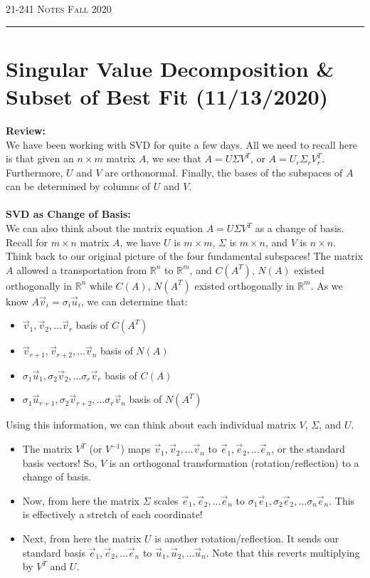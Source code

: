 \documentclass[12pt]{amsart}
\begin{document}
\thispagestyle{empty}

{\scshape 21-241} \hfill {\scshape \Large Notes} \hfill {\scshape Fall 2020}
\medskip
\hrule
\bigskip

\section*{Singular Value Decomposition \& Subset of Best Fit (11/13/2020)}
\textbf{Review:}\\
We have been working with SVD for quite a few days. All we need to recall here is that given an $n \times m$ matrix $A$, we see that $A = U \Sigma V^T$, or $A = U_r \Sigma_r V_r^T$. Furthermore, $U$ and $V$ are orthonormal. Finally, the bases of the subspaces of $A$ can be determined by columns of $U$ and $V$.
\\
\\
\textbf{SVD as Change of Basis:}\\
We can also think about the matrix equation $A = U \Sigma V^T$ as a change of basis. Recall for $m \times n$ matrix $A$, we have $U$ is $m \times m$, $\Sigma$ is $m \times n$, and $V$ is $n \times n$. Think back to our original picture of the four fundamental subspaces! The matrix $A$ allowed a transportation from $\mathbb{R}^n$ to $\mathbb{R}^m$, and $C(A^T)$, $N(A)$ existed orthogonally in $\mathbb{R}^n$ while $C(A)$, $N(A^T)$ existed orthogonally in $\mathbb{R}^m$. As we know $A \vec{v}_i = \sigma_i\vec{u}_i$, we can determine that:
\begin{itemize}
	\item $\vec{v}_1, \vec{v}_2, \dots \vec{v}_r$ basis of $C(A^T)$
	\item $\vec{v}_{r+1}, \vec{v}_{r+2}, \dots \vec{v}_n$ basis of $N(A)$
	\item $\sigma_1\vec{u}_1, \sigma_2\vec{v}_2, \dots \sigma_r\vec{v}_r$ basis of $C(A)$
	\item $\sigma_1\vec{u}_{r+1}, \sigma_2\vec{v}_{r+2}, \dots \sigma_r\vec{v}_n$ basis of $N(A^T)$
\end{itemize}
Using this information, we can think about each individual matrix $V$, $\Sigma$, and $U$.
\begin{itemize}
	\item The matrix $V^T$ (or $V^{-1}$) maps $\vec{v}_1, \vec{v}_2, \dots \vec{v}_n$ to $\vec{e}_1, \vec{e}_2, \dots \vec{e}_n$, or the standard basis vectors! So, $V$ is an orthogonal transformation (rotation/reflection) to a change of basis.
	\item Now, from here the matrix $\Sigma$ scales $\vec{e}_1, \vec{e}_2, \dots \vec{e}_n$ to $\sigma_1\vec{e}_1, \sigma_2\vec{e}_2, \dots \sigma_n\vec{e}_n$. This is effectively a stretch of each coordinate!
	\item Next, from here the matrix $U$ is another rotation/reflection. It sends our standard basis $\vec{e}_1, \vec{e}_2, \dots \vec{e}_n$ to $\vec{u}_1, \vec{u}_2, \dots \vec{u}_n$. Note that this reverts multiplying by $V^T$ and $U$.
\end{itemize}
\end{document}
